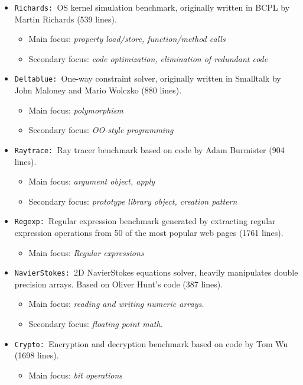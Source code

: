 \begin{itemize}
\item \texttt{Richards: }OS kernel simulation benchmark, originally written in BCPL by Martin Richards (539 lines).
  \begin{itemize}
    \item Main focus: \textit{property load/store, function/method calls}
    \item Secondary focus: \textit{code optimization, elimination of redundant code}
  \end{itemize}
\item \texttt{Deltablue: }One-way constraint solver, originally written in Smalltalk by John Maloney and Mario Wolczko (880 lines).
  \begin{itemize}
    \item Main focus: \textit{polymorphism}
    \item Secondary focus: \textit{OO-style programming}
  \end{itemize}
\item \texttt{Raytrace: }Ray tracer benchmark based on code by Adam Burmister (904 lines).
  \begin{itemize}
    \item Main focus: \textit{argument object, apply}
    \item Secondary focus: \textit{prototype library object, creation pattern}
  \end{itemize}
\item \texttt{Regexp: }Regular expression benchmark generated by extracting regular expression operations from 50 of the most popular web pages (1761 lines).
  \begin{itemize}
    \item Main focus: \textit{Regular expressions}
  \end{itemize}
  \item \texttt{NavierStokes: }2D NavierStokes equations solver, heavily manipulates double precision arrays. Based on Oliver Hunt's code (387 lines).
  \begin{itemize}
    \item Main focus: \textit{reading and writing numeric arrays.}
    \item Secondary focus: \textit{floating point math.}
  \end{itemize}
  \item \texttt{Crypto: }Encryption and decryption benchmark based on code by Tom Wu (1698 lines).
  \begin{itemize}
    \item Main focus: \textit{bit operations}

\end{itemize}
\end{itemize}
